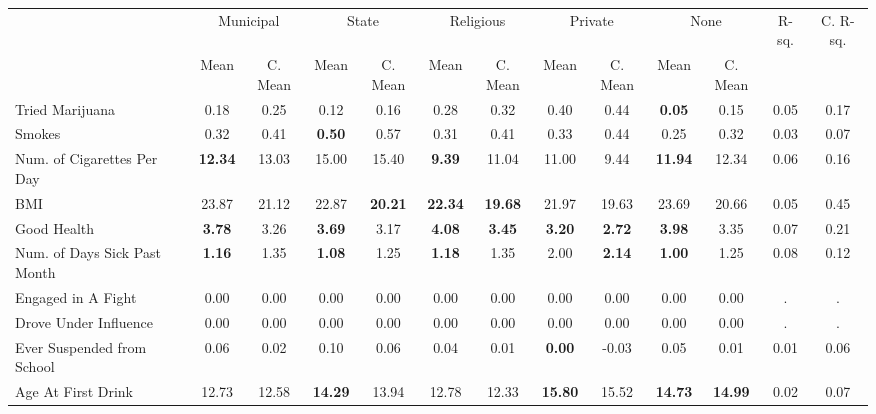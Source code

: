 \begin{tabular}{l c c c c c c c c c c c c}
\toprule
& \multicolumn{2}{c}{Municipal} & \multicolumn{2}{c}{State} & \multicolumn{2}{c}{Religious} & \multicolumn{2}{c}{Private} & \multicolumn{2}{c}{None} & R-sq. & C. R-sq. \\
& \scriptsize Mean & \scriptsize C. Mean & \scriptsize Mean & \scriptsize C. Mean & \scriptsize Mean & \scriptsize C. Mean & \scriptsize Mean & \scriptsize C. Mean & \scriptsize Mean & \scriptsize C. Mean & & \\
\midrule
Tried Marijuana &      0.18 & 0.25 &      0.12 & 0.16 &      0.28 & 0.32 &      0.40 & 0.44 & \textbf{     0.05} & 0.15 &      0.05 &      0.17 \\
Smokes &      0.32 & 0.41 & \textbf{     0.50} & 0.57 &      0.31 & 0.41 &      0.33 & 0.44 &      0.25 & 0.32 &      0.03 &      0.07 \\
Num. of Cigarettes Per Day & \textbf{    12.34} & 13.03 &     15.00 & 15.40 & \textbf{     9.39} & 11.04 &     11.00 & 9.44 & \textbf{    11.94} & 12.34 &      0.06 &      0.16 \\
BMI &     23.87 & 21.12 &     22.87 & \textbf{    20.21} & \textbf{    22.34} & \textbf{    19.68} &     21.97 & 19.63 &     23.69 & 20.66 &      0.05 &      0.45 \\
Good Health & \textbf{     3.78} & 3.26 & \textbf{     3.69} & 3.17 & \textbf{     4.08} & \textbf{     3.45} & \textbf{     3.20} & \textbf{     2.72} & \textbf{     3.98} & 3.35 &      0.07 &      0.21 \\
Num. of Days Sick Past Month & \textbf{     1.16} & 1.35 & \textbf{     1.08} & 1.25 & \textbf{     1.18} & 1.35 &      2.00 & \textbf{     2.14} & \textbf{     1.00} & 1.25 &      0.08 &      0.12 \\
Engaged in A Fight &      0.00 & 0.00 &      0.00 & 0.00 &      0.00 & 0.00 &      0.00 & 0.00 &      0.00 & 0.00 &         . &         . \\
Drove Under Influence &      0.00 & 0.00 &      0.00 & 0.00 &      0.00 & 0.00 &      0.00 & 0.00 &      0.00 & 0.00 &         . &         . \\
Ever Suspended from School &      0.06 & 0.02 &      0.10 & 0.06 &      0.04 & 0.01 & \textbf{     0.00} & -0.03 &      0.05 & 0.01 &      0.01 &      0.06 \\
Age At First Drink &     12.73 & 12.58 & \textbf{    14.29} & 13.94 &     12.78 & 12.33 & \textbf{    15.80} & 15.52 & \textbf{    14.73} & \textbf{    14.99} &      0.02 &      0.07 \\
\bottomrule
\end{tabular}
